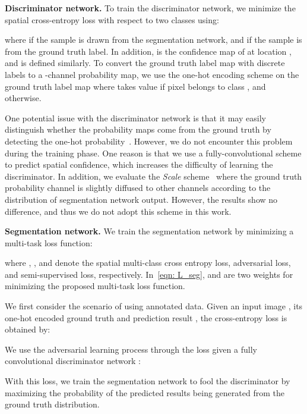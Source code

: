 \documentclass{bmvc2k}
\begin{document}
	\vspace{-2mm}	
	{\flushleft \bf Discriminator network.}
To train the discriminator network, we minimize the spatial cross-entropy loss  with respect to two classes using:


	
	
	where  if the sample is drawn from the segmentation network, and  if the sample is from the ground truth label.
In addition,  is the confidence map of  
	at location , and  is defined similarly.
To convert the ground truth label map with discrete labels to a -channel probability map, we use the one-hot encoding scheme on the ground truth label map where  takes value  if pixel  belongs to class , and  otherwise.


One potential issue with the discriminator network is that it may easily distinguish whether the probability maps come from the ground truth by detecting the one-hot probability~\cite{luc2016semantic}. 
However, we do not encounter this problem during the training phase.
One reason is that we use a fully-convolutional scheme to predict spatial confidence, which increases the difficulty of learning the discriminator.
In addition, we evaluate the \textit{Scale} scheme~\cite{luc2016semantic} 
	where the ground truth probability channel is slightly diffused to other channels according to the distribution of segmentation network output. 
However, the results show no difference, and thus we do not adopt this scheme in this work.
	
	\vspace{-2mm}		
	{\flushleft \bf Segmentation network.}
We train the segmentation network by minimizing a multi-task loss function:

where , , and  denote the spatial multi-class cross entropy loss, adversarial loss, and semi-supervised loss, respectively.
In~\eqref{eqn: L_seg},  and  are two weights 
	for minimizing the proposed multi-task loss function.
	
	We first consider the scenario of using annotated data. Given an input image , its one-hot encoded ground truth  and prediction result , the cross-entropy loss is obtained by:
	
We use the adversarial learning process through the loss  given a fully convolutional discriminator network :
	
With this loss, we train the segmentation network to fool the discriminator by maximizing the probability of the predicted results being generated from the ground truth distribution.
	
\end{document}
